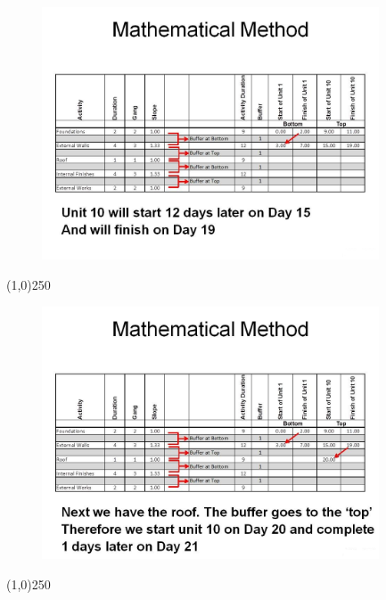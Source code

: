 \begin{frame}
\begin{figure}
	\centering
		\includegraphics[width = 10.0cm]{oldnotes/Slide288.jpg}
\end{figure}
\end{frame}
\begin{center}\line(1,0){250}\end{center}






\begin{frame}
\begin{figure}
	\centering
		\includegraphics[width = 10.0cm]{oldnotes/Slide289.jpg}
\end{figure}
\end{frame}
\begin{center}\line(1,0){250}\end{center}






